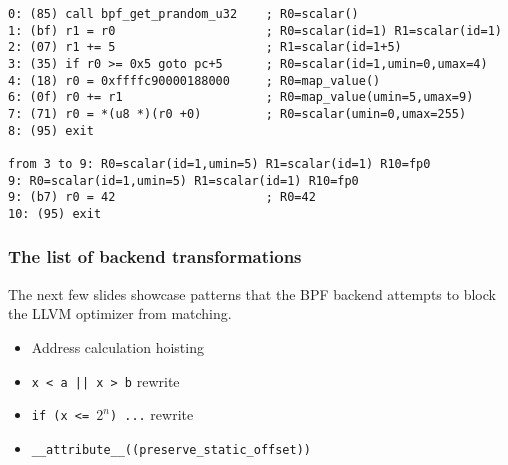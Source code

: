 \documentclass{beamer}
\newcommand{\code}[1]{\texttt{#1}}
\begin{document}
\begin{frame}
    \begin{verbatim}
0: (85) call bpf_get_prandom_u32    ; R0=scalar()
1: (bf) r1 = r0                     ; R0=scalar(id=1) R1=scalar(id=1)
2: (07) r1 += 5                     ; R1=scalar(id=1+5)
3: (35) if r0 >= 0x5 goto pc+5      ; R0=scalar(id=1,umin=0,umax=4)
4: (18) r0 = 0xffffc90000188000     ; R0=map_value()
6: (0f) r0 += r1                    ; R0=map_value(umin=5,umax=9)
7: (71) r0 = *(u8 *)(r0 +0)         ; R0=scalar(umin=0,umax=255)
8: (95) exit

from 3 to 9: R0=scalar(id=1,umin=5) R1=scalar(id=1) R10=fp0
9: R0=scalar(id=1,umin=5) R1=scalar(id=1) R10=fp0
9: (b7) r0 = 42                     ; R0=42
10: (95) exit      
    \end{verbatim}

\end{frame}

\begin{frame}
  \frametitle{The list of backend transformations}

  The next few slides showcase patterns that the BPF backend attempts
  to block the LLVM optimizer from matching.

  \begin{itemize}
    \item Address calculation hoisting
    \item \code{x < a || x > b} rewrite
    \item \code{if (x <= $2^n$) ...} rewrite
    \item \code{\_\_attribute\_\_((preserve\_static\_offset))}
  \end{itemize}
\end{frame}
\end{document}
